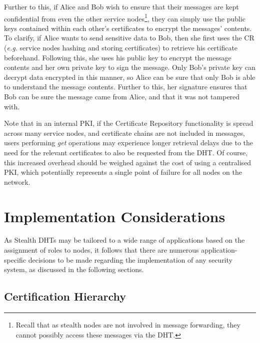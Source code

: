 \documentclass[pdftex,conference,10pt]{IEEEtran}
\begin{document}
Further to this, if Alice and Bob wish to ensure that their messages
are kept confidential from even the other service nodes\footnote{Recall
that as stealth nodes are not involved in message forwarding, they
cannot possibly access these messages via the DHT.}, they can simply
use the public keys contained within each other's certificates to
encrypt the messages' contents. To clarify, if Alice wants to send
sensitive data to Bob, then she first uses the CR (\emph{e.g.} service
nodes hashing and storing certificates) to retrieve his certificate
beforehand. Following this, she uses his public key to encrypt the
message contents and her own private key to sign the message. Only
Bob's private key can decrypt data encrypted in this manner, so Alice
can be sure that only Bob is able to understand the message contents.
Further to this, her signature ensures that Bob can be sure the message
came from Alice, and that it was not tampered with.

Note that in an internal PKI, if the Certificate Repository
functionality is spread across many service nodes, and certificate
chains are not included in messages, users performing \emph{get}
operations may experience longer retrieval delays due to the need for
the relevant certificates to also be requested from the DHT. Of course,
this increased overhead should be weighed against the cost of using a
centralised PKI, which potentially represents a single point of failure
for all nodes on the network.

\section{Implementation Considerations}
\label{sect-considerations}

As Stealth DHTs may be tailored to a wide range of applications based
on the assignment of roles to nodes, it follows that there are numerous
application-specific decisions to be made regarding the implementation
of any security system, as discussed in the following sections.

\subsection{Certification Hierarchy}
\end{document}
